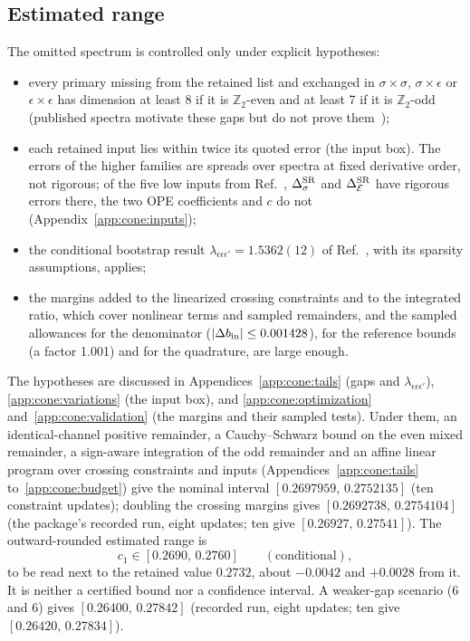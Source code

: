 \documentclass[11pt,a4paper]{article}
\numberwithin{equation}{section}
\newcommand{\De}{\Delta_{\mathcal E}}
\newcommand{\Ds}{\Delta_\sigma}
\begin{document}
\subsection{Estimated range}\label{sec:range}
The omitted spectrum is controlled only under explicit hypotheses:
\begin{itemize}
\item every primary missing from the retained list and exchanged in $\sigma\times\sigma$, $\sigma\times\epsilon$ or
 $\epsilon\times\epsilon$ has dimension at least 8 if it is $\mathbb Z_2$-even and at least 7 if it is
 $\mathbb Z_2$-odd (published spectra motivate these gaps but do not prove
 them~\cite{Simmons-Duffin:2016wlq,Henriksson:2022,Zhu:2022,Fardelli:2026});
\item each retained input lies within twice its quoted error (the input box). The errors of the higher families are
 spreads over spectra at fixed derivative order, not rigorous; of the five low inputs from Ref.~\cite{Chang:2024whx},
 $\Ds^{\rm SR}$ and $\De^{\rm SR}$ have rigorous errors there, the two OPE coefficients and $c$ do not
 (Appendix~\ref{app:cone:inputs});
\item the conditional bootstrap result $\lambda_{\epsilon\epsilon\epsilon'}=1.5362(12)$ of Ref.~\cite{Reehorst:2021},
 with its sparsity assumptions, applies;
\item the margins added to the linearized crossing constraints and to the integrated ratio, which cover nonlinear terms
 and sampled remainders, and the sampled allowances for the denominator ($|\Delta b_{\rm in}|\le0.001428$), for the
 reference bounds (a factor 1.001) and for the quadrature, are large enough.
\end{itemize}
The hypotheses are discussed in Appendices~\ref{app:cone:tails} (gaps and $\lambda_{\epsilon\epsilon\epsilon'}$),
\ref{app:cone:variations} (the input box), and \ref{app:cone:optimization} and~\ref{app:cone:validation} (the margins
and their sampled tests).
Under them, an identical-channel positive remainder, a Cauchy--Schwarz bound on the even mixed remainder, a sign-aware
integration of the odd remainder and an affine linear program over crossing constraints and inputs
(Appendices~\ref{app:cone:tails} to~\ref{app:cone:budget}) give the nominal interval $[0.2697959,\,0.2752135]$ (ten
constraint updates); doubling the crossing margins gives $[0.2692738,\,0.2754104]$ (the package's recorded run, eight
updates; ten give $[0.26927,\,0.27541]$). The
outward-rounded estimated range is
\begin{equation}
 c_1\in[0.2690,\,0.2760]\qquad(\text{conditional}),
\end{equation}
to be read next to the retained value $0.2732$, about $-0.0042$ and $+0.0028$ from it. It is neither a certified
bound nor a confidence interval. A weaker-gap scenario (6 and 6) gives $[0.26400,\,0.27842]$ (recorded run, eight updates; ten give
$[0.26420,\,0.27834]$).
\end{document}
